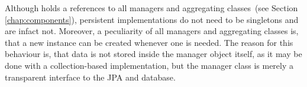 Although  holds a references to all managers and aggregating classes (see Section \ref{chap:components}), persistent implementations do not need to be singletons and are infact not.
Moreover, a peculiarity of all managers and aggregating classes is, that a new instance can be created whenever one is needed.
The reason for this behaviour is, that data is not stored inside the manager object itself, as it may be done with a collection-based implementation, but the manager class is merely a transparent interface to the JPA and database.\\


